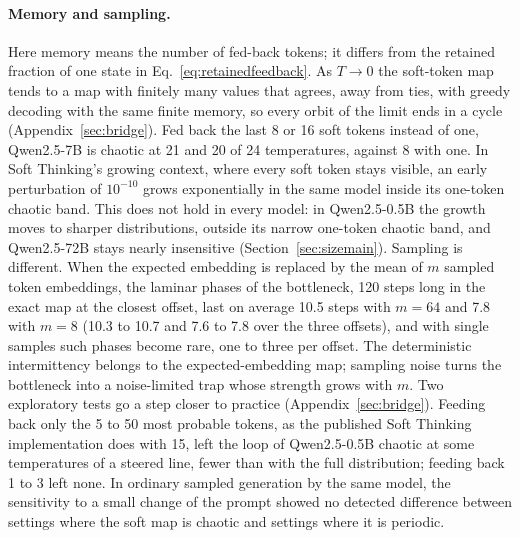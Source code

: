 \documentclass[11pt,letterpaper]{article}
\begin{document}
\paragraph{Memory and sampling.} Here memory means the number of fed-back tokens; it differs from the retained
fraction of one state in Eq.~\eqref{eq:retainedfeedback}. As $T\to0$ the soft-token map tends to a map with finitely many values that agrees,
away from ties, with greedy decoding with the same finite memory, so every orbit of the limit ends in a cycle
(Appendix~\ref{sec:bridge}). Fed back the last 8 or 16 soft tokens instead of one,
Qwen2.5-7B is chaotic at 21 and 20 of 24 temperatures, against 8 with one. In Soft Thinking's growing context, where
every soft token stays visible, an early perturbation of $10^{-10}$ grows exponentially in the same model inside its
one-token chaotic band. This does not hold in every model: in Qwen2.5-0.5B the growth moves to sharper distributions,
outside its narrow one-token chaotic band, and Qwen2.5-72B stays nearly insensitive (Section~\ref{sec:sizemain}). Sampling is different. When the expected embedding is replaced by the mean of $m$ sampled
token embeddings, the laminar phases of the bottleneck, 120 steps long in the exact map at the closest offset, last on average 10.5 steps with $m=64$ and 7.8 with $m=8$ (10.3 to 10.7 and 7.6 to 7.8 over the three offsets), and
with single samples such phases become rare, one to three per offset. The deterministic
intermittency belongs to the expected-embedding map; sampling noise turns the bottleneck into a noise-limited trap
whose strength grows with $m$. Two exploratory tests go a step closer to practice (Appendix~\ref{sec:bridge}). Feeding back
only the 5 to 50 most probable tokens, as the published Soft Thinking implementation does with 15, left the loop of
Qwen2.5-0.5B chaotic at some temperatures of a steered line, fewer than with the full distribution; feeding back 1 to
3 left none. In ordinary sampled generation by the same model, the sensitivity to a small change of the prompt showed
no detected difference between settings where the soft map is chaotic and settings where it is periodic.
\end{document}
